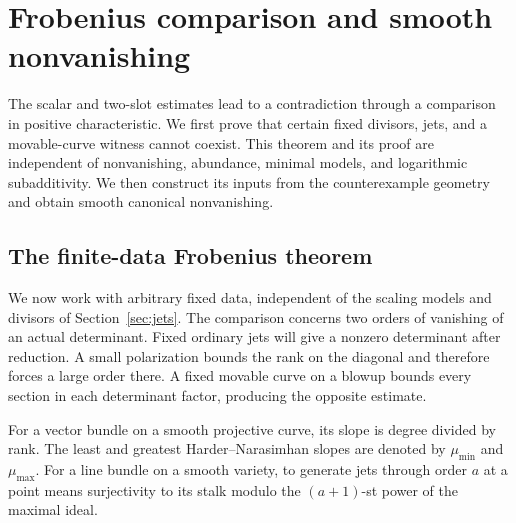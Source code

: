 \section{Frobenius comparison and smooth nonvanishing}
\label{fr:section}

The scalar and two-slot estimates lead to a contradiction through a
comparison in positive characteristic. We first prove that certain
fixed divisors, jets, and a movable-curve witness cannot coexist.
This theorem and its proof are independent of nonvanishing, abundance,
minimal models, and logarithmic subadditivity. We then construct its
inputs from the counterexample geometry and obtain smooth canonical
nonvanishing.

\subsection{The finite-data Frobenius theorem}
\label{common:frobenius-tools}

We now work with arbitrary fixed data, independent of the scaling
models and divisors of Section~\ref{sec:jets}. The comparison concerns
two orders of vanishing of an actual determinant. Fixed ordinary jets
will give a nonzero determinant after reduction. A small polarization bounds the
rank on the diagonal and therefore forces a large order there.
A fixed movable curve on a blowup bounds every section in each
determinant factor, producing the opposite estimate.

For a vector bundle on a smooth projective curve, its slope is
degree divided by rank. The least and greatest Harder--Narasimhan
slopes are denoted by $\mu_{\min}$ and $\mu_{\max}$.
For a line bundle on a smooth variety, to generate jets through
order $a$ at a point means surjectivity to its stalk modulo
the $(a+1)$-st power of the maximal ideal.

